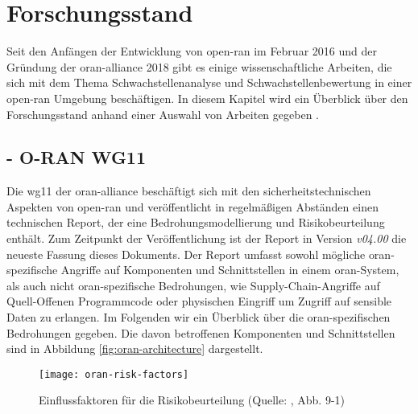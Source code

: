 \chapter{Forschungsstand}
\label{chap:forschungsstand}
Seit den Anfängen der Entwicklung von \gls{open-ran} im Februar 2016 und der Gründung der \gls{oran-alliance} 2018 gibt es einige wissenschaftliche Arbeiten, die sich mit dem Thema Schwachstellenanalyse und Schwachstellenbewertung in einer \gls{open-ran} Umgebung beschäftigen. In diesem Kapitel wird ein Überblick über den Forschungsstand anhand einer Auswahl von Arbeiten gegeben \autocite{Us} \autocite{GuideOpenRAN}.
%
\section{ - O-RAN WG11}
\label{sec:forschungsstand-wg11}
Die \gls{wg11} der \gls{oran-alliance} beschäftigt sich mit den sicherheitstechnischen Aspekten von \gls{open-ran} und veröffentlicht in regelmäßigen Abständen einen technischen Report, der eine Bedrohungsmodellierung und Risikobeurteilung enthält. Zum Zeitpunkt der Veröffentlichung ist der Report in Version \textit{\textsf{v04.00}} die neueste Fassung dieses Dokuments. Der Report umfasst sowohl mögliche \gls{oran}-spezifische Angriffe auf Komponenten und Schnittstellen in einem \gls{oran}-System, als auch nicht \gls{oran}-spezifische Bedrohungen, wie Supply-Chain-Angriffe auf Quell-Offenen Programmcode oder physischen Eingriff um Zugriff auf sensible Daten zu erlangen\autocite{o-ranworkgroup11securityworkgroupORANSecurityThreat2024}. Im Folgenden wir ein Überblick über die \gls{oran}-spezifischen Bedrohungen gegeben. Die davon betroffenen Komponenten und Schnittstellen sind in Abbildung \ref{fig:oran-architecture} dargestellt.
\begin{figure}[H]
    \centering
    \texttt{[image: oran-risk-factors]}
    \caption{Einflussfaktoren für die Risikobeurteilung (Quelle: \autocite{o-ranworkgroup11securityworkgroupORANSecurityThreat2024}, Abb. 9-1)}
    \label{fig:oran-risk-factors}
\end{figure}
